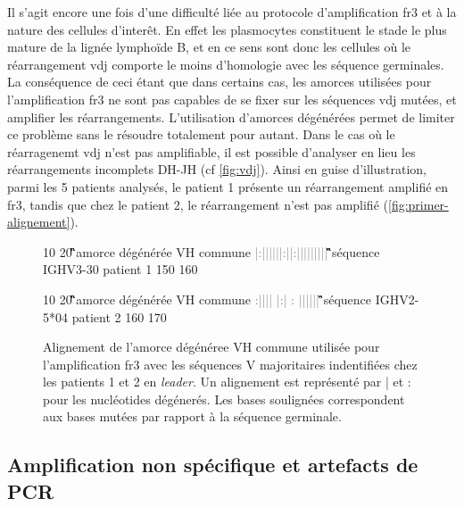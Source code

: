 Il s'agit encore une fois d'une difficulté liée au protocole d'amplification \gls{fr}3 et à la nature des cellules d'interêt. 
En effet les plasmocytes constituent le stade le plus mature de la lignée lymphoïde B, et en ce sens sont donc les cellules où le 
réarrangement \gls{vdj} comporte le moins d'homologie avec les séquence germinales. La conséquence de ceci étant que dans certains 
cas, les amorces utilisées pour l'amplification \gls{fr}3 ne sont pas capables de se fixer sur les séquences \gls{vdj} mutées, et 
amplifier les réarrangements. L'utilisation d'amorces dégénérées permet de limiter ce problème sans le résoudre totalement pour autant. 
Dans le cas où le réarragenemt \gls{vdj} n'est pas amplifiable, il est possible d'analyser en lieu les réarrangements incomplets DH-JH 
(cf \autoref{fig:vdj}). Ainsi en guise d'illustration, parmi les 5 patients analysés, le patient 1 présente un réarrangement amplifié 
en \gls{fr}3, tandis que chez le patient 2, le réarrangement n'est pas amplifié (\autoref{fig:primer-alignement}).

\begin{figure}[H]
    \centering
    \begin{ColoredVerbatim}
                10         20 
        \G\Hbase\G\G\A\C\A\C\N\G\C\Y\G\T\G\T\A\T\T\A\C amorce dégénérée VH commune
        \textcolor{gray}{|:||||||:||:|||||||||}
        \G\A\G\G\A\C\A\C\G\G\C\T\G\T\G\T\A\T\T\A\C séquence IGHV3-30 patient 1
           150       160

                10        20 
        \G\Hbase\G\G\A\C\A\C\N\G\C\Y\G\T\G\T\A\T\T\A\C amorce dégénérée VH commune
        \textcolor{gray}{ :|||| |:| :   ||||||}
        \A\T\G\G\A\C\Tb\C\A\G\G\C\A\C\Tb\T\A\T\T\A\C séquence IGHV2-5*04 patient 2
              160       170
    \end{ColoredVerbatim}
    \caption{
        Alignement de l'amorce dégénéree VH commune utilisée pour l'amplification \gls{fr}3 
        avec les séquences V majoritaires indentifiées chez les patients 1 et 2 en \textit{leader}. 
        Un alignement est représenté par | et : pour les nucléotides dégénerés. Les bases soulignées 
        correspondent aux bases mutées par rapport à la séquence germinale.
    }
    \label{fig:primer-alignement}
\end{figure}
    
\subsection{Amplification non spécifique et artefacts de PCR}

